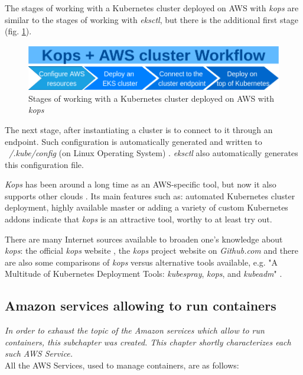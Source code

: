 The stages of working with a Kubernetes cluster deployed on AWS with \textit{kops} are similar to the stages of working with \textit{eksctl}, but there is the additional first stage (fig. \ref{fig:kaw}).
\begin{figure}[H]
    \centering
    \includegraphics[width=12cm]{figures/kops-aws-workflow.png}
    \captionsetup{justification=centering,margin=2cm}
    \caption{Stages of working with a Kubernetes cluster deployed on AWS with \textit{kops}}
    \label{fig:kaw}
\end{figure}

The next stage, after instantiating a cluster is to connect to it through an endpoint. Such configuration is automatically generated and written to \textit{~/.kube/config} (on Linux Operating System) \cite{online-kops-aws}. \textit{eksctl} also automatically generates this configuration file.

\textit{Kops} has been around a long time as an AWS-specific tool, but now it also supports other clouds \cite{book-cndwk,online-kops-gh}. Its main features such as: automated Kubernetes cluster deployment, highly available master or adding a variety of custom Kubernetes addons \cite{kops-addons} indicate that \textit{kops} is an attractive tool, worthy to at least try out.

There are many Internet sources available to broaden one's knowledge about \textit{kops}: the official \textit{kops} website \cite{online-kops}, the \textit{kops} project website on \textit{Github.com} \cite{online-kops-gh} and there are also some comparisons of \textit{kops} versus alternative tools available, e.g. "A Multitude of Kubernetes Deployment Tools: \textit{kubespray}, \textit{kops}, and \textit{kubeadm}" \cite{online-kops-blog}.

\subsection{Amazon services allowing to run containers}
\textit{In order to exhaust the topic of the Amazon services which allow to run containers, this subchapter was created. This chapter shortly characterizes each such AWS Service.}
\\

All the AWS Services, used to manage containers, are as follows:
\begin{itemize}
\item \textitAWS ECS} (Elastic Container Service),
\item \textitAWS ECR} (Elastic Container Registry),
\item \textitAWS Fargate},
\item \textit{AWS EKS} (Elastic Kubernetes Service).
\end{itemize}

